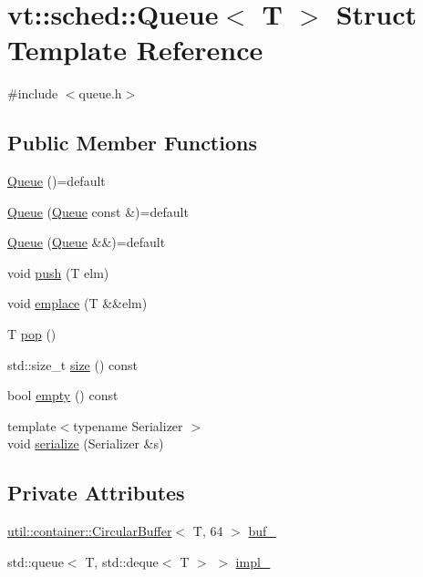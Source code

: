 \hypertarget{structvt_1_1sched_1_1_queue}{}\section{vt\+:\+:sched\+:\+:Queue$<$ T $>$ Struct Template Reference}
\label{structvt_1_1sched_1_1_queue}


{\ttfamily \#include $<$queue.\+h$>$}

\subsection*{Public Member Functions}
\begin{DoxyCompactItemize}
\item 
\hyperlink{structvt_1_1sched_1_1_queue_a5bca57d5a8c3bb7bfb30ed1bc634c29f}{Queue} ()=default
\item 
\hyperlink{structvt_1_1sched_1_1_queue_a718cecfdd0b3fa8ec80fe4768e153467}{Queue} (\hyperlink{structvt_1_1sched_1_1_queue}{Queue} const \&)=default
\item 
\hyperlink{structvt_1_1sched_1_1_queue_a0a85a456ebc179a2f7ab77369566eb5c}{Queue} (\hyperlink{structvt_1_1sched_1_1_queue}{Queue} \&\&)=default
\item 
void \hyperlink{structvt_1_1sched_1_1_queue_a5079f0b8b665ec528767a12ab210d1be}{push} (T elm)
\item 
void \hyperlink{structvt_1_1sched_1_1_queue_a5b99b53786540fdff718540010fecb1b}{emplace} (T \&\&elm)
\item 
T \hyperlink{structvt_1_1sched_1_1_queue_ad5e435489eb04cd78a2da6acfa855331}{pop} ()
\item 
std\+::size\+\_\+t \hyperlink{structvt_1_1sched_1_1_queue_a0d5cd0a31703541be21f3bbd1590464e}{size} () const
\item 
bool \hyperlink{structvt_1_1sched_1_1_queue_a499b45b0a8c55731b09885dbd28882a8}{empty} () const
\item 
{\footnotesize template$<$typename Serializer $>$ }\\void \hyperlink{structvt_1_1sched_1_1_queue_aaa65b12c2cd3aca57fc59a1d5db25792}{serialize} (Serializer \&s)
\end{DoxyCompactItemize}
\subsection*{Private Attributes}
\begin{DoxyCompactItemize}
\item 
\hyperlink{structvt_1_1util_1_1container_1_1_circular_buffer}{util\+::container\+::\+Circular\+Buffer}$<$ T, 64 $>$ \hyperlink{structvt_1_1sched_1_1_queue_a8518d84b809ea6d340e7a0d261533849}{buf\+\_\+}
\item 
std\+::queue$<$ T, std\+::deque$<$ T $>$ $>$ \hyperlink{structvt_1_1sched_1_1_queue_a68cbe05570c230c55b730d8e98a1f6a5}{impl\+\_\+}
\end{DoxyCompactItemize}


